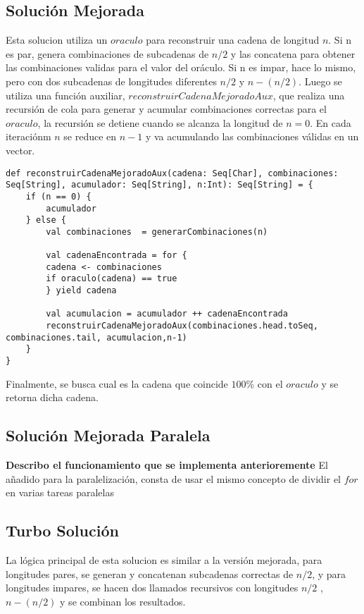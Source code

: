 \documentclass[conference]{IEEEtran}
\begin{document}
\subsection{\textbf{Solución Mejorada}}
Esta solucion utiliza un $oraculo$ para reconstruir una cadena de longitud $n$. Si n es par, genera combinaciones de subcadenas de $n/2$ y las concatena para obtener las combinaciones validas para el valor del oráculo. Si n es impar, hace lo mismo, pero con dos subcadenas de longitudes diferentes $n/2$  y $n-(n/2)$. Luego se utiliza una función auxiliar, $reconstruirCadenaMejoradoAux$, que realiza una recursión de cola para generar y acumular combinaciones correctas para el $oraculo$, la recursión se detiene cuando se alcanza  la longitud de $n=0$. En cada iteraciónm $n$ se reduce en $n-1$ y va acumulando las combinaciones válidas en un vector. 

\newpage
\begin{lstlisting}
def reconstruirCadenaMejoradoAux(cadena: Seq[Char], combinaciones: Seq[String], acumulador: Seq[String], n:Int): Seq[String] = {
    if (n == 0) {
        acumulador
    } else {
        val combinaciones  = generarCombinaciones(n)
                
        val cadenaEncontrada = for {
        cadena <- combinaciones
        if oraculo(cadena) == true
        } yield cadena
            
        val acumulacion = acumulador ++ cadenaEncontrada
        reconstruirCadenaMejoradoAux(combinaciones.head.toSeq, combinaciones.tail, acumulacion,n-1)
    }
}

\end{lstlisting}


Finalmente, se busca cual es la cadena que coincide $100$\% con el $oraculo$ y se retorna dicha cadena.


\subsection{\textbf{Solución Mejorada Paralela}}

\textbf{Describo el funcionamiento que se implementa anterioremente}
El añadido para la paralelización, consta de usar el mismo concepto de dividir el $for$ en varias tareas paralelas

\subsection{\textbf{Turbo Solución}}
La lógica principal de esta solucion es similar a la versión mejorada, para longitudes pares, se generan y concatenan subcadenas correctas de $n/2$, y para longitudes impares, se hacen dos llamados recursivos con longitudes $n/2$ , $n-(n/2)$ y se combinan los resultados.
\end{document}
